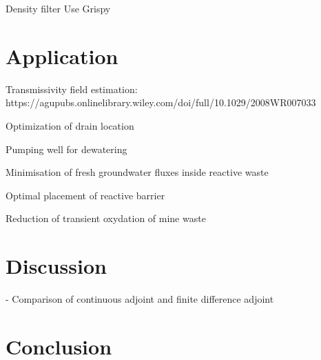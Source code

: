 \documentclass[11pt]{article}
\begin{document}
Density filter
Use Grispy




\section{Application}

Transmissivity field estimation: https://agupubs.onlinelibrary.wiley.com/doi/full/10.1029/2008WR007033

Optimization of drain location

Pumping well for dewatering

Minimisation of fresh groundwater fluxes inside reactive waste

Optimal placement of reactive barrier

Reduction of transient oxydation of mine waste



\section{Discussion}
-
Comparison of continuous adjoint and finite difference adjoint %


\section{Conclusion}
\end{document}
